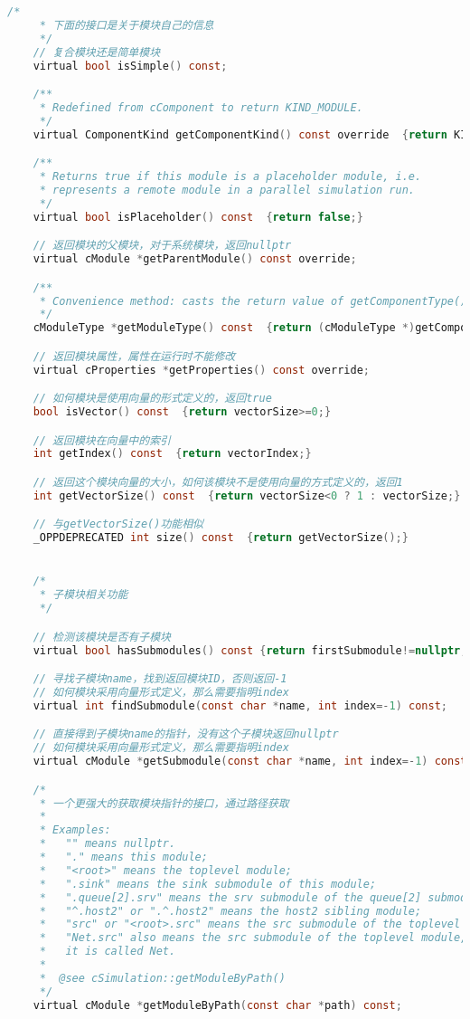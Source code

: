 \begin{lstlisting}[language=c]
    /*
     * 下面的接口是关于模块自己的信息
     */
    // 复合模块还是简单模块
    virtual bool isSimple() const;

    /**
     * Redefined from cComponent to return KIND_MODULE.
     */
    virtual ComponentKind getComponentKind() const override  {return KIND_MODULE;}

    /**
     * Returns true if this module is a placeholder module, i.e.
     * represents a remote module in a parallel simulation run.
     */
    virtual bool isPlaceholder() const  {return false;}

    // 返回模块的父模块，对于系统模块，返回nullptr
    virtual cModule *getParentModule() const override;

    /**
     * Convenience method: casts the return value of getComponentType() to cModuleType.
     */
    cModuleType *getModuleType() const  {return (cModuleType *)getComponentType();}

    // 返回模块属性，属性在运行时不能修改
    virtual cProperties *getProperties() const override;

    // 如何模块是使用向量的形式定义的，返回true
    bool isVector() const  {return vectorSize>=0;}

    // 返回模块在向量中的索引
    int getIndex() const  {return vectorIndex;}

    // 返回这个模块向量的大小，如何该模块不是使用向量的方式定义的，返回1
    int getVectorSize() const  {return vectorSize<0 ? 1 : vectorSize;}

    // 与getVectorSize()功能相似
    _OPPDEPRECATED int size() const  {return getVectorSize();}


    /*
     * 子模块相关功能
     */

    // 检测该模块是否有子模块
    virtual bool hasSubmodules() const {return firstSubmodule!=nullptr;}

    // 寻找子模块name，找到返回模块ID，否则返回-1
    // 如何模块采用向量形式定义，那么需要指明index
    virtual int findSubmodule(const char *name, int index=-1) const;

    // 直接得到子模块name的指针，没有这个子模块返回nullptr
    // 如何模块采用向量形式定义，那么需要指明index
    virtual cModule *getSubmodule(const char *name, int index=-1) const;

    /*
     * 一个更强大的获取模块指针的接口，通过路径获取
     *
     * Examples:
     *   "" means nullptr.
     *   "." means this module;
     *   "<root>" means the toplevel module;
     *   ".sink" means the sink submodule of this module;
     *   ".queue[2].srv" means the srv submodule of the queue[2] submodule;
     *   "^.host2" or ".^.host2" means the host2 sibling module;
     *   "src" or "<root>.src" means the src submodule of the toplevel module;
     *   "Net.src" also means the src submodule of the toplevel module, provided
     *   it is called Net.
     *
     *  @see cSimulation::getModuleByPath()
     */
    virtual cModule *getModuleByPath(const char *path) const;


\end{lstlisting}
